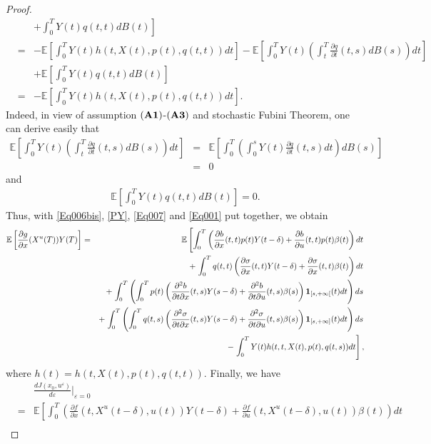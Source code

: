 \documentclass[12pt]{article}
\theoremstyle{remark}
\numberwithin{equation}{section}
\def\E{\mathbb E}
\def\E{\mathbb E}
\begin{document}
\begin{proof}
\begin{eqnarray}
&&\left.+\int_0^T Y(t)q(t,t)dB(t)\right] \nonumber\\
&=& -\E\left[\int_{0}^{T}Y(t)h(t,X(t),p(t),q(t,t))dt\right]-\E\left[\int_{0}^{T}Y(t)\left(\int_{t}^{T}\frac{\partial q}{\partial t}(t,s)dB(s)\right)dt\right]\nonumber\\
&&+\E\left[\int_0^T Y(t)q(t,t)dB(t)\right]\nonumber\\
&=&-\E\left[\int_{0}^{T}Y(t)h(t,X(t),p(t),q(t,t))dt\right].
\end{eqnarray}
Indeed, in view of assumption $({\bf A1})$-$({\bf A3})$ and stochastic Fubini Theorem, one can derive easily that 
\begin{eqnarray*}
	\E\left[\int_{0}^{T}Y(t)\left(\int_{t}^{T}\frac{\partial q}{\partial t}(t,s)dB(s)\right)dt\right]&=&\E\left[\int_{0}^{T}\left(\int_{0}^{s}Y(t)\frac{\partial q}{\partial t}(t,s)dt\right)dB(s)\right]\\
	&=& 0
\end{eqnarray*}
and 
\begin{eqnarray*}
	\E\left[\int_0^T Y(t)q(t,t)dB(t)\right]=0.
\end{eqnarray*}
Thus, with \eqref{Eq006bis}, \eqref{PY}, \eqref{Eq007} and \eqref{Eq001} put together, we obtain
\begin{eqnarray*}
\E\left[\frac{\partial g}{\partial x}(X^{u}(T))Y(T)\right]&=& \E\left[\int_0^T\left(\frac{\partial b}{\partial x}(t, t)p(t) Y(t-\delta)+\frac{\partial b}{\partial u}(t, t)p(t) \beta(t)\right)dt\right.\nonumber\\
&&+\left.\int_{0}^{T}q(t,t)\left( \frac{\partial \sigma}{\partial x}(t,t)Y(t-\delta) + \frac{\partial \sigma}{\partial x}(t,t)\beta(t)\right)dt\right.\\
&&+\left. \int_0^T \left( \int_0^T p(t) \left(\frac{\partial^{2}
	b}{\partial t \partial x}(t, s)Y(s-\delta)+\frac{\partial^{2}
		b}{\partial t \partial u}(t, s)\beta(s)\right){\bf 1 }_{[s,+\infty[}(t)dt\right)ds\right.\nonumber\\
&&+\left.\int_0^T \left( \int_0^T q(t,s)\left(\frac{\partial^{2} \sigma}{\partial t \partial x}(t, s)Y(s-\delta)+\frac{\partial^{2} \sigma}{\partial t \partial u}(t, s)\beta(s)\right){\bf 1 }_{[s,+\infty]}(t)dt \right) ds\right.\\
&&-\left. \int_{0}^{T}Y(t)h(t,t,X(t),p(t),q(t,s))dt\right],
\end{eqnarray*} 
where $h(t)=h(t,X(t),p(t),q(t,t))$.\newpage
Finally, we have
\begin{eqnarray*}
&&\frac{dJ(x_0,u^{\varepsilon})}{d\varepsilon}|_{\varepsilon=0}\\ &=&	\mathbb{E}\left[\int_{0}^{T}\left(\frac{\partial f}{\partial x}(t,X^{u}(t-\delta),u(t))Y(t-\delta)+\frac{\partial f}{\partial u}(t,X^{u}(t-\delta),u(t))\beta(t)\right)dt\right.\\

\end{eqnarray*}
\end{proof}
\end{document}
